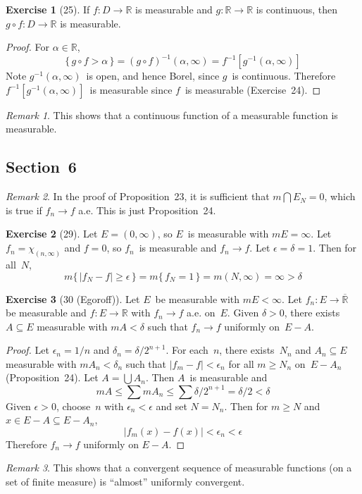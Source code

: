 \documentclass[letterpaper,12pt]{article}
\newcommand{\R}{\mathbb{R}}
\newcommand{\Rex}{\overline{\R}}
\newcommand{\bigunion}{\bigcup}
\newcommand{\bigsect}{\bigcap}
\newcommand{\after}{\circ}
\newcommand{\m}{m}
\newcommand{\abs}[1]{|{#1}|}
\newcommand{\chr}[1]{\chi_{#1}}
\newcommand{\inv}[1]{#1^{-1}}
\theoremstyle{plain}
\theoremstyle{definition}
\newtheorem*{exer}{Exercise}
\theoremstyle{remark}
\newtheorem*{rmk}{Remark}
\begin{document}
\begin{exer}[25]
If \(f:D\to\R\) is measurable and \(g:\R\to\R\) is continuous, then \(g\after f:D\to\R\) is measurable.
\end{exer}
\begin{proof}
For \(\alpha\in\R\),
\[\{\,g\after f>\alpha\,\}=\inv{(g\after f)}(\alpha,\infty)=\inv{f}[\inv{g}(\alpha,\infty)]\]
Note \(\inv{g}(\alpha,\infty)\)~is open, and hence Borel, since \(g\)~is continuous. Therefore \(\inv{f}[\inv{g}(\alpha,\infty)]\)~is measurable since \(f\)~is measurable (Exercise~24).
\end{proof}
\begin{rmk}
This shows that a continuous function of a measurable function is measurable.
\end{rmk}

\subsection*{Section~6}
\begin{rmk}
In the proof of Proposition~23, it is sufficient that \(\m\bigsect E_N=0\), which is true if \(f_n\to f\) a.e. This is just Proposition~24.
\end{rmk}

\begin{exer}[29]
Let \(E=(0,\infty)\), so \(E\)~is measurable with \(\m E=\infty\). Let \(f_n=\chr{(n,\infty)}\) and \(f=0\), so \(f_n\)~is measurable and \(f_n\to f\). Let \(\epsilon=\delta=1\). Then for all~\(N\),
\[\m\{\,\abs{f_N-f}\ge\epsilon\,\}=\m\{\,f_N=1\,\}=\m(N,\infty)=\infty>\delta\]
\end{exer}

\begin{exer}[30 (Egoroff)]
Let \(E\)~be measurable with \(\m E<\infty\). Let \(f_n:E\to\Rex\) be measurable and \(f:E\to\R\) with \(f_n\to f\) a.e. on~\(E\). Given \(\delta>0\), there exists \(A\subseteq E\) measurable with \(\m A<\delta\) such that \(f_n\to f\) uniformly on~\(E-A\).
\end{exer}
\begin{proof}
Let \(\epsilon_n=1/n\) and \(\delta_n=\delta/2^{n+1}\). For each~\(n\), there exists~\(N_n\) and \(A_n\subseteq E\) measurable with \(\m A_n<\delta_n\) such that \(\abs{f_m-f}<\epsilon_n\) for all \(m\ge N_n\) on~\(E-A_n\) (Proposition~24). Let \(A=\bigunion A_n\). Then \(A\)~is measurable and
\[\m A\le\sum\m A_n\le\sum\delta/2^{n+1}=\delta/2<\delta\]
Given \(\epsilon>0\), choose~\(n\) with \(\epsilon_n<\epsilon\) and set \(N=N_n\). Then for \(m\ge N\) and \(x\in E-A\subseteq E-A_n\),
\[\abs{f_m(x)-f(x)}<\epsilon_n<\epsilon\]
Therefore \(f_n\to f\) uniformly on \(E-A\).
\end{proof}
\begin{rmk}
This shows that a convergent sequence of measurable functions (on a set of finite measure) is ``almost'' uniformly convergent.
\end{rmk}
\end{document}
